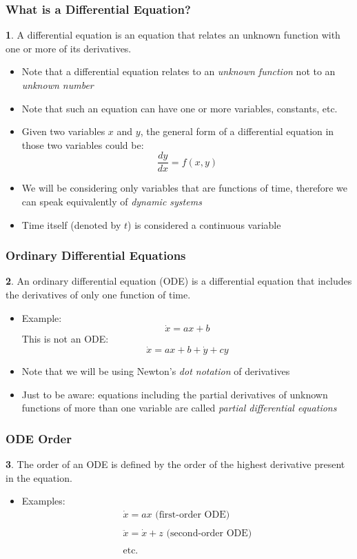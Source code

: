\documentclass[10pt,usenames,dvipsnames]{beamer}
\theoremstyle{definition}
\newtheorem{definition}{\translate{Definition}}
\begin{document}
\begin{frame}[fragile]
\frametitle{What is a Differential Equation?}
\begin{definition}
	A differential equation is an equation that relates an unknown function with one or more of its derivatives.
\end{definition}
\begin{itemize}
	\item Note that a differential equation relates to an \textit{unknown function} not to an \textit{unknown number}
	\item Note that such an equation can have one or more variables, constants, etc.
	\item Given two variables $x$ and $y$, the general form of a differential equation in those two variables could be:
	\[
		\dfrac{dy}{dx} = f(x,y)
	\]
	\item We will be considering only variables that are functions of time, therefore we can speak equivalently of \textit{dynamic systems}
	\item Time itself (denoted by $t$) is considered a continuous variable
\end{itemize}
\end{frame}

\begin{frame}[fragile]
\frametitle{Ordinary Differential Equations}
\begin{definition}
	An ordinary differential equation (ODE) is a differential equation that includes the derivatives of only one function of time.
\end{definition}
\begin{itemize}
	\item Example:
	\[
		\dot{x} = ax + b
	\]
	This is not an ODE:
	\[
		\dot{x} = ax + b + \dot{y} + cy
	\]
	\item Note that we will be using Newton's \textit{dot notation} of derivatives
	\item Just to be aware: equations including the partial derivatives of unknown functions of more than one variable are called \textit{partial differential equations}
\end{itemize}
\end{frame}

\begin{frame}[fragile]
\frametitle{ODE Order}
\begin{definition}
	The order of an ODE is defined by the order of the highest derivative present in the equation.
\end{definition}
\begin{itemize}
	\item Examples:
	\[
		\begin{array}{lcl}
			\dot{x} = ax \textrm{ (first-order ODE)}\\
			\quad\\
			\ddot{x} = \dot{x} + z \textrm{ (second-order ODE)}\\
			\quad\\
			\textrm{etc.}
		\end{array}
	\]
\end{itemize}
\end{frame}
\end{document}
